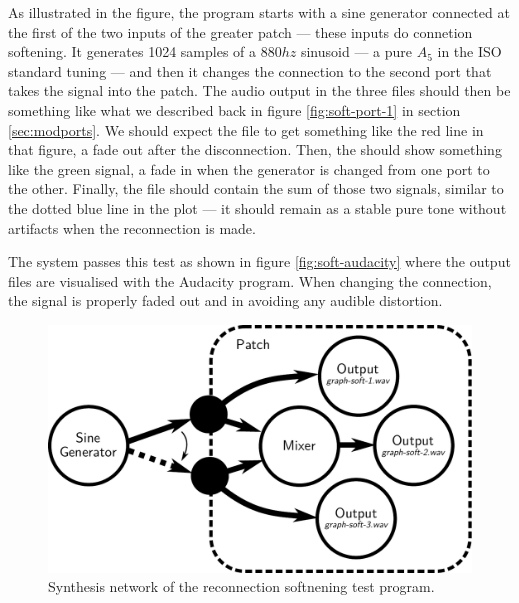 \begin{description}
  As illustrated in the figure, the program starts with a sine
  generator connected at the first of the two inputs of the greater
  patch --- these inputs do connetion softening. It generates 1024
  samples of a $880 hz$ sinusoid --- a pure $A_5$ in the ISO standard
  tuning \cite{pitchstd} --- and then it changes the connection to the
  second port that takes the signal into the patch. The audio output
  in the three files should then be something like what we described
  back in figure \ref{fig:soft-port-1} in section
  \ref{sec:modports}. We should expect the 
  file to get something like the red line in that figure, a fade out
  after the disconnection. Then, the  should
  show something like the green signal, a fade in when the generator
  is changed from one port to the other. Finally, the
   file should contain the sum of those two
  signals, similar to the dotted blue line in the plot --- it should
  remain as a stable pure tone without artifacts when the reconnection
  is made.

  The system passes this test as shown in figure
  \ref{fig:soft-audacity} where the output files are visualised with
  the Audacity program. When changing the connection, the signal is
  properly faded out and in avoiding any audible distortion.
\end{description}

\begin{figure}[h!]
  \centering
  \includegraphics[width=\textwidth]{pic/graph-soft.pdf}
  \caption{Synthesis network of the reconnection softnening test
    program.}
  \label{fig:examplegraphsoft}
\end{figure}

